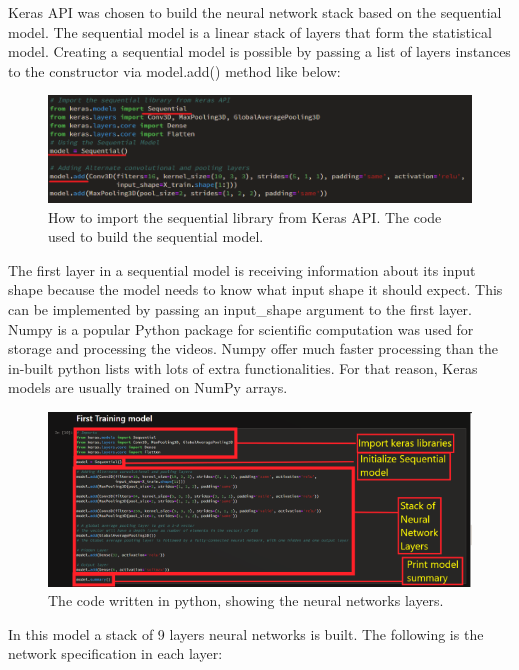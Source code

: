 Keras API was chosen to build the neural network stack based on the sequential model. The sequential model is a linear stack of layers that form the statistical model. Creating a sequential model is possible by passing a list of layers instances to the constructor via model.add() method like below:
\begin{figure}[ht]
\centering
\includegraphics{Figures/se1}
\decoRule
\caption[How to import the sequential library from Keras API. The code used to build the sequential model.]{How to import the sequential library from Keras API. The code used to build the sequential model.}
\label{fig:la}
\end{figure}
The first layer in a sequential model is receiving information about its input shape because the model needs to know what input shape it should expect. This can be implemented by passing an input\_shape argument to the first layer. \\

Numpy is a popular Python package for scientific computation was used for storage and processing the videos. Numpy offer much faster processing than the in-built python lists with lots of extra functionalities. For that reason, Keras models are usually trained on NumPy arrays.

\begin{figure}[ht]
\centering
\includegraphics{Figures/suma1}
\decoRule
\caption[The code written in python, showing the neural networks layers.]{The code written in python, showing the neural networks layers.}
\label{fig:la}
\end{figure}
In this model a stack of 9 layers neural networks is built. The following is the network specification in each layer:

